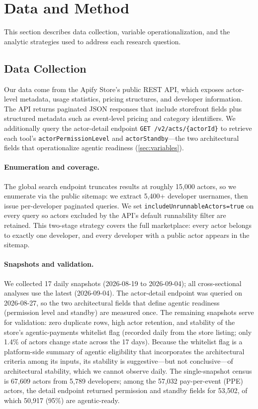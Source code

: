 \section{Data and Method}
\label{sec:method}

This section describes data collection, variable operationalization, and the
analytic strategies used to address each research question.

\subsection{Data Collection}
\label{sec:data}

Our data come from the Apify Store's public REST API, which exposes actor-level
metadata, usage statistics, pricing structures, and developer information. The
API returns paginated JSON responses that include storefront fields plus
structured metadata such as event-level pricing and category identifiers. We
additionally query the actor-detail endpoint \texttt{GET /v2/acts/\{actorId\}}
to retrieve each tool's \texttt{actorPermissionLevel} and
\texttt{actorStandby}---the two architectural fields that operationalize
agentic readiness (\autoref{sec:variables}).

\paragraph{Enumeration and coverage.}
The global search endpoint truncates results at roughly 15{,}000 actors, so we
enumerate via the public sitemap: we extract 5{,}400+ developer usernames, then
issue per-developer paginated queries. We set \texttt{includeUnrunnableActors=true}
on every query so actors excluded by the API's default runnability filter are
retained. This two-stage strategy covers the full marketplace: every actor
belongs to exactly one developer, and every developer with a public actor
appears in the sitemap.

\paragraph{Snapshots and validation.}
We collected 17 daily snapshots (2026-08-19 to 2026-09-04); all
cross-sectional analyses use the latest (2026-09-04). The actor-detail endpoint
was queried on 2026-08-27, so the two architectural fields that define agentic
readiness (permission level and standby) are measured once. The remaining
snapshots serve for validation: zero duplicate rows, high actor retention, and
stability of the store's agentic-payments whitelist flag (recorded daily from
the store listing; only 1.4\% of actors change state across the 17 days).
Because the whitelist flag is a platform-side summary of agentic eligibility
that incorporates the architectural criteria among its inputs, its stability is
suggestive---but not conclusive---of architectural stability, which we cannot
observe daily. The single-snapshot census is 67{,}609 actors from
5{,}789 developers; among the 57{,}032 pay-per-event (PPE) actors, the detail
endpoint returned permission and standby fields for 53{,}502, of which 50{,}917
(95\%) are agentic-ready.

